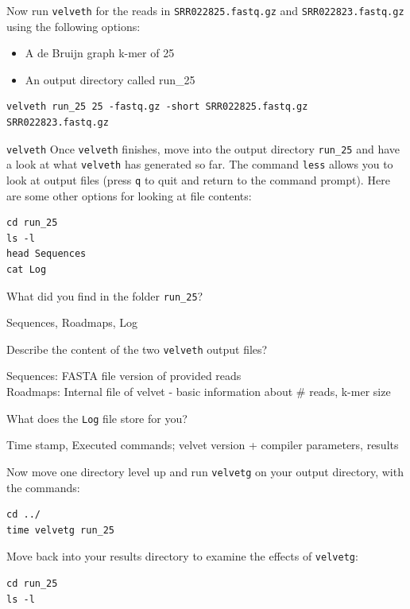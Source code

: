 \begin{steps}
Now run \texttt{velveth} for the reads in \texttt{SRR022825.fastq.gz} and
\texttt{SRR022823.fastq.gz} using the following options:
\begin{itemize}
  \item A de Bruijn graph k-mer of 25
  \item An output directory called run\_25
\end{itemize}
\begin{lstlisting}
velveth run_25 25 -fastq.gz -short SRR022825.fastq.gz SRR022823.fastq.gz
\end{lstlisting}

\texttt{velveth} Once \texttt{velveth} finishes, move into the output directory
\texttt{run\_25} and have a look at what \texttt{velveth} has generated so far.
The command \texttt{less} allows you to look at output files (press \texttt{q}
to quit and return to the command prompt). Here are some other options for
looking at file contents:

\begin{lstlisting}
cd run_25
ls -l
head Sequences
cat Log
\end{lstlisting}

\end{steps}

\begin{questions}
What did you find in the folder \texttt{run\_25}?
\begin{answer}
Sequences, Roadmaps, Log
\end{answer}

Describe the content of the two \texttt{velveth} output files?
\begin{answer}
Sequences: FASTA file version of provided reads\\
Roadmaps: Internal file of velvet - basic information about # reads, k-mer size
\end{answer}

What does the \texttt{Log} file store for you?
\begin{answer}
Time stamp, Executed commands; velvet version + compiler parameters, results
\end{answer}
\end{questions}

\begin{steps}
Now move one directory level up and run \texttt{velvetg} on your output directory, with
the commands:
\begin{lstlisting}
cd ../
time velvetg run_25
\end{lstlisting}

Move back into your results directory to examine the effects of \texttt{velvetg}:
\begin{lstlisting}
cd run_25
ls -l
\end{lstlisting}
\end{steps}

